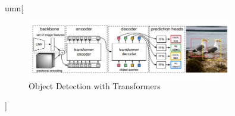 umn[\begin{@twocolumnfalse}

\begin{center}
    
\begin{figure}[ht]
    \centering
    \includegraphics[width=0.8\textwidth]{Resources/Images/detr.png}
    \caption{Object Detection with Transformers}
    \label{fig:DETR}
    \end{figure}

\end{center}
\end{@twocolumnfalse}]
